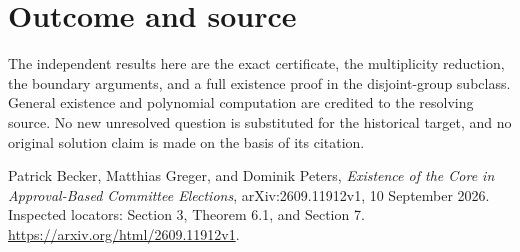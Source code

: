 \documentclass[11pt]{article}
\begin{document}
\section*{Outcome and source}
The independent results here are the exact certificate, the multiplicity
reduction, the boundary arguments, and a full existence proof in the
disjoint-group subclass. General existence and polynomial computation
are credited to the resolving source. No new unresolved question is
substituted for the historical target, and no original solution claim
is made on the basis of its citation.

Patrick Becker, Matthias Greger, and Dominik Peters,
\emph{Existence of the Core in Approval-Based Committee Elections},
arXiv:2609.11912v1, 10 September 2026. Inspected locators: Section 3,
Theorem 6.1, and Section 7.
\url{https://arxiv.org/html/2609.11912v1}.
\end{document}
